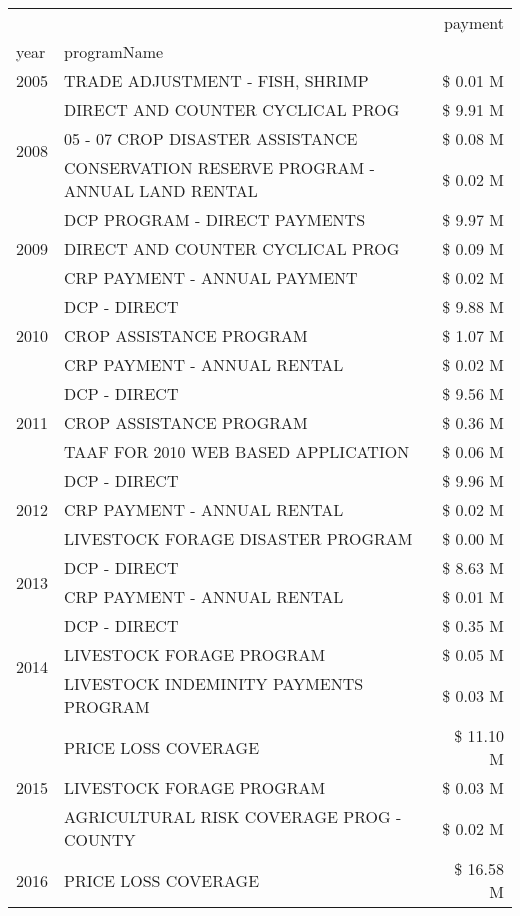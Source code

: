 \begin{tabular}{llr}
\toprule
 &  & payment \\
year & programName &  \\
\midrule
2005 & TRADE ADJUSTMENT - FISH, SHRIMP & \$ 0.01 M \\
\cline{1-3}
\multirow[t]{3}{*}{2008} & DIRECT AND COUNTER CYCLICAL PROG & \$ 9.91 M \\
 & 05 - 07 CROP DISASTER ASSISTANCE & \$ 0.08 M \\
 & CONSERVATION RESERVE PROGRAM - ANNUAL LAND RENTAL & \$ 0.02 M \\
\cline{1-3}
\multirow[t]{3}{*}{2009} & DCP PROGRAM - DIRECT PAYMENTS & \$ 9.97 M \\
 & DIRECT AND COUNTER CYCLICAL PROG & \$ 0.09 M \\
 & CRP PAYMENT - ANNUAL PAYMENT & \$ 0.02 M \\
\cline{1-3}
\multirow[t]{3}{*}{2010} & DCP - DIRECT & \$ 9.88 M \\
 & CROP ASSISTANCE PROGRAM & \$ 1.07 M \\
 & CRP PAYMENT - ANNUAL RENTAL & \$ 0.02 M \\
\cline{1-3}
\multirow[t]{3}{*}{2011} & DCP - DIRECT & \$ 9.56 M \\
 & CROP ASSISTANCE PROGRAM & \$ 0.36 M \\
 & TAAF FOR 2010 WEB BASED APPLICATION & \$ 0.06 M \\
\cline{1-3}
\multirow[t]{3}{*}{2012} & DCP - DIRECT & \$ 9.96 M \\
 & CRP PAYMENT - ANNUAL RENTAL & \$ 0.02 M \\
 & LIVESTOCK FORAGE DISASTER PROGRAM & \$ 0.00 M \\
\cline{1-3}
\multirow[t]{2}{*}{2013} & DCP - DIRECT & \$ 8.63 M \\
 & CRP PAYMENT - ANNUAL RENTAL & \$ 0.01 M \\
\cline{1-3}
\multirow[t]{3}{*}{2014} & DCP - DIRECT & \$ 0.35 M \\
 & LIVESTOCK FORAGE PROGRAM & \$ 0.05 M \\
 & LIVESTOCK INDEMINITY PAYMENTS PROGRAM & \$ 0.03 M \\
\cline{1-3}
\multirow[t]{3}{*}{2015} & PRICE LOSS COVERAGE & \$ 11.10 M \\
 & LIVESTOCK FORAGE PROGRAM & \$ 0.03 M \\
 & AGRICULTURAL RISK COVERAGE PROG - COUNTY & \$ 0.02 M \\
\cline{1-3}
\multirow[t]{3}{*}{2016} & PRICE LOSS COVERAGE & \$ 16.58 M \\

\end{tabular}
